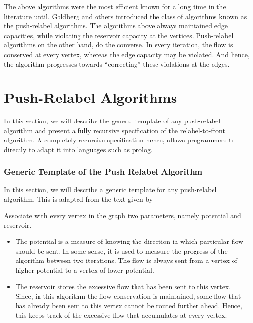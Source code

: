 \documentclass[BTech]{iitmdiss}
\begin{document}
	    The above algorithms were the most efficient known for a long time in the literature until, Goldberg and others introduced the 
	    class of algorithms known as the push-relabel algorithms. The algorithms above always maintained edge capacities, while violating the 
	    reservoir capacity at the vertices. Push-relabel algorithms on the other hand, do the converse. In every iteration, the flow is 
	    conserved at every vertex, whereas the edge capacity may be violated. And hence, the algorithm progresses towards ``correcting'' these violations
	    at the edges. \\
	    
	   \section{Push-Relabel Algorithms}
	      In this section, we will describe the general template of any push-relabel algorithm and present a fully recursive specification
	      of the relabel-to-front algorithm. A completely recursive specification hence, allows programmers to directly to adapt it into languages
	      such as prolog. \\
	      
	      
	      \subsubsection{Generic Template of the Push Relabel Algorithm}
	      In this section, we will describe a generic template for any push-relabel algorithm. This is adapted from the text given by 
	      \cite{clrs}.
	      
	      Associate with every vertex in the graph two parameters, namely potential and reservoir.
	      \begin{itemize}
	       \item 
		  The potential is a measure of knowing the direction in which particular flow should be sent.
	      In some sense, it is used to measure the progress of the algorithm between two iterations.
	      The flow is always sent from a vertex of higher potential to a vertex of lower potential. \\
	      
	      \item
		  The reservoir stores the excessive flow that has been sent to this vertex. Since, in this algorithm the flow conservation is maintained,
		  some flow that has already been sent to this vertex cannot be routed further ahead. Hence, this keeps track of the excessive flow 
		  that accumulates at every vertex. \\
		  
		  
	      \end{itemize}
\end{document}

